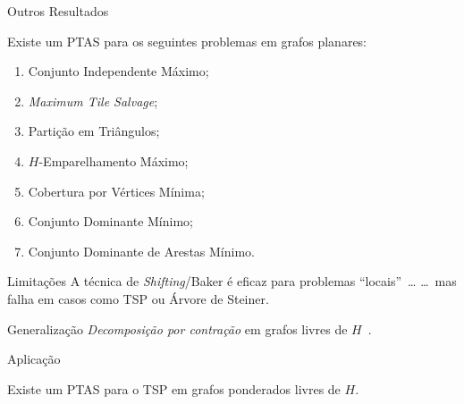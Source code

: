 \begin{frame}{Outros Resultados}
    \begin{thm}
        Existe um PTAS para os seguintes problemas em grafos planares:

        \begin{enumerate}[]
            \item Conjunto Independente Máximo;
            \item \emph{Maximum Tile Salvage};
            \item Partição em Triângulos;
            \item $H$-Emparelhamento Máximo;
            \item Cobertura por Vértices Mínima;
            \item Conjunto Dominante Mínimo;
            \item Conjunto Dominante de Arestas Mínimo.
        \end{enumerate}
    \end{thm}
\end{frame}

\begin{frame}{Limitações}
    \centering
    A técnica de \emph{Shifting}/Baker é eficaz para problemas ``locais''~\dots
    \bigbreak\pause
    \dots~mas falha em casos como TSP ou Árvore de Steiner.
\end{frame}

\begin{frame}{Generalização}
    \centering\large
    \emph{Decomposição por contração} em grafos livres de $H$~\cite{Dem11}.
\end{frame}

\begin{frame}{Aplicação}
    \begin{thm}
        Existe um PTAS para o TSP em grafos ponderados livres de $H$.
    \end{thm}
\end{frame}